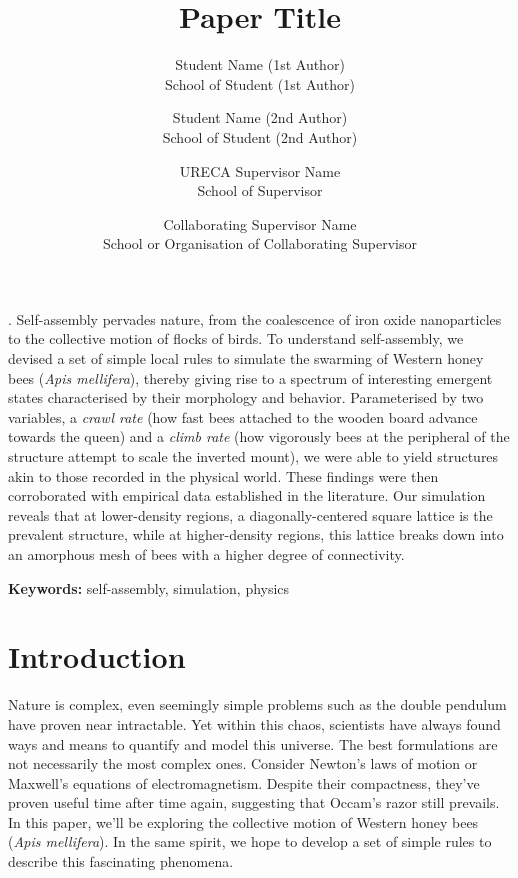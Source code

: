 \documentclass[a4paper,10pt]{article}
\title{Paper Title}
\date{}
\author{
    {Student Name (1st Author)} \\
    School of Student (1st Author) \\
    \and
    {Student Name (2nd Author)} \\
    School of Student (2nd Author) \\
    \and
    {URECA Supervisor Name} \\
    School of Supervisor \\
    \and
    {Collaborating Supervisor Name} \\
    School or Organisation of Collaborating Supervisor
}
\renewenvironment{abstract}{
    \small
\noindent\textbf{\textit{\abstractname}}.\hspace{1em}} %
{}
\begin{document}
\maketitle

\begin{multicols}{2}

    \begin{abstract}
        Self-assembly pervades nature, from the coalescence of iron oxide nanoparticles
        to the collective motion of flocks of birds. To understand self-assembly, we
        devised a set of simple local rules to simulate the swarming of Western
        honey bees (\textit{Apis mellifera}), thereby giving rise to a spectrum of
        interesting emergent states characterised by their morphology and behavior.
        Parameterised by two variables, a \textit{crawl rate} (how fast bees attached
        to the wooden board advance towards the queen) and a \textit{climb rate} (how
        vigorously bees at the peripheral of the structure attempt to scale the inverted
        mount), we were able to yield structures akin to those recorded in the
        physical world. These findings were then corroborated with empirical data established
        in the literature. Our simulation reveals that at lower-density
        regions, a diagonally-centered square lattice is the prevalent structure, while
        at higher-density regions, this lattice breaks down into an amorphous mesh
        of bees with a higher degree of connectivity.
    \end{abstract}

    \textbf{Keywords:} self-assembly, simulation, physics

    \section{Introduction}

    Nature is complex, even seemingly simple problems such as the double pendulum
    have proven near intractable. Yet within this chaos, scientists have always
    found ways and means to quantify and model this universe. The best formulations are
    not necessarily the most complex ones. Consider Newton's laws of motion or Maxwell's
    equations of electromagnetism. Despite their compactness, they've proven useful time
    after time again, suggesting that Occam's razor still prevails. In this paper, we'll be
    exploring the collective motion of Western honey bees (\textit{Apis mellifera}). In
    the same spirit, we hope to develop a set of simple rules to describe this fascinating
    phenomena.


\end{multicols}
\end{document}
